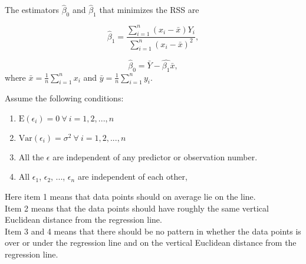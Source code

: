 \documentclass{article}
\begin{document}
The estimators \(\hat{\beta}_0\) and \(\hat{\beta}_1\) that minimizes the RSS are

\begin{equation} \label{eq:beta1}
 \hat{\beta}_1 = \frac{\sum_{i = 1}^n\left( x_i - \bar{x} \right) Y_i}{\sum_{i = 1}^n\left( x_i - \bar{x} \right)^2} ,
\end{equation}

\begin{equation} \label{eq:beta0}
 \hat{\beta}_0 = \bar{Y} - \hat{\beta_1}\bar{x},
\end{equation}
where \(\bar{x} = \frac{1}{n} \sum_{i = 1}^n x_i\) and \(\bar{y} = \frac{1}{n}
\sum_{i = 1}^n y_i\). \cite[Chapter 11]{st1101}

Assume the following conditions:

\begin{enumerate}
\item \(\mathrm{E} \left( \epsilon_i \right) = 0\ \forall \ i = 1, 2, ..., n\)
\item \(\mathrm{Var} \left( \epsilon_i \right) = \sigma^2\ \forall \ i = 1, 2, ..., n\)
\item All the \(\epsilon\) are independent of any predictor or observation number.
\item All \(\epsilon_1\), \(\epsilon_2\), ..., \(\epsilon_n\) are independent of each other,
\end{enumerate}



Here item 1 means that data points should on average lie on the line. \\
Item 2 means that the data points should have roughly the same vertical
Euclidean distance from the regression line. \\
Item 3 and 4 means that there should be no pattern in whether the data points is over
or under the regression line and on the vertical Euclidean distance from the
regression line.
\end{document}
